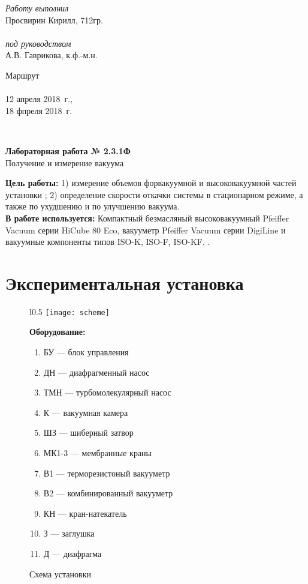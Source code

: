\documentclass[a4paper,12pt]{article} %
\newcommand{\RomanNumeralCaps}[1]
{\MakeUppercase{\romannumeral #1}}
\begin{document}
	
	
\begin{minipage}[l]{0.3\textwidth}
	\textit{Работу выполнил}\\
	Просвирин Кирилл, 712гр.\\\\
	\textit{под руководством}\\
	А.В. Гаврикова, к.ф.-м.н.
\end{minipage}
\hfill
\begin{minipage}[l]{0.2\textwidth}
	Маршрут \RomanNumeralCaps{9} \\\\
	12 апреля 2018~г.,\\
	18 фпреля 2018~г.\\
\end{minipage}
\\[20pt]
\begin{center}
	\LARGE{\textbf{Лабораторная работа № 2.3.1Ф}\\
		Получение и измерение вакуума \\[20pt]}
\end{center}

\textbf{Цель работы: }1) измерение объемов форвакуумной и 
высоковакуумной частей установки ; 2) определение скорости
откачки системы в стационарном режиме, а также по
ухудшению и по улучшению вакуума.\\

\textbf{В работе используется: }
Компактный безмасляный высоковакуумный Pfeiffer Vacuum серии
HiCube 80 Eco, вакууметр Pfeiffer Vacuum серии DigiLine и
вакуумные компоненты типов ISO-K, ISO-F, ISO-KF. .


\section{Экспериментальная установка}
\begin{figure}[!h]
	\begin{wrapfigure}[50]{l}{0.5\textwidth}
		\vspace{-4ex}
		\texttt{[image: scheme]}
		\caption{Схема установки} 
	\end{wrapfigure}
	
	\textbf{Оборудование:}
	\begin{enumerate}
		\item БУ — блок управления
		\item ДН
		— диафрагменный насос
		\item ТМН — турбомолекулярный насос
		\item К
		— вакуумная камера
		\item ШЗ
		— шиберный затвор
		\item МК1-3 — мембранные краны
		\item В1
		— терморезистоный вакууметр
		\item В2
		— комбинированный вакууметр
		\item КН
		— кран-натекатель
		\item З
		— заглушка
		\item Д
		— диафрагма
	\end{enumerate}
\end{figure}
\end{document}
